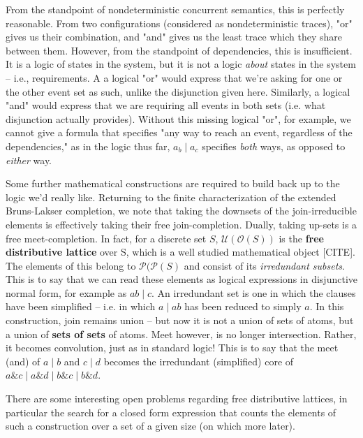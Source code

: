\documentclass[hoptionsi,review,format=acmsmall]{acmart}
\theoremstyle{definition}
\newcommand{\Oc}{\mathcal{O}}
\newcommand{\Pc}{\mathcal{P}}
\newcommand{\Ucc}{\mathcal{U}}
\newcommand{\band}{\mathbin{\&}}
\newcommand{\bor}{\mathbin{|}}
\begin{document}

From the standpoint of nondeterministic concurrent semantics, this is perfectly reasonable. From two configurations (considered as nondeterministic traces), "or" gives us their combination, and "and" gives us the least trace which they share between them. However, from the standpoint of dependencies, this is insufficient. It is a logic of states in the system, but it is not a logic \textit{about} states in the system -- i.e., requirements. A a logical "or"  would express that we're asking for one or the other event set as such, unlike the disjunction given here. Similarly, a logical "and" would express that we are requiring all events in both sets (i.e. what disjunction actually provides). Without this missing logical "or", for example, we cannot give a formula that specifies "any way to reach an event, regardless of the dependencies," as in the logic thus far, \(a_b \bor a_c\) specifies \textit{both} ways, as opposed to \textit{either} way.

Some further mathematical constructions are required to build back up to the logic we'd really like. Returning to the finite characterization of the extended Bruns-Lakser completion, we note that taking the downsets of the join-irreducible elements is effectively taking their free join-completion. Dually, taking up-sets is a free meet-completion. In fact, for a discrete set \(S\), \(\Ucc(\Oc(S))\) is the \textbf{free distributive lattice} over S, which is a well studied mathematical object [CITE]. The elements of this belong to \(\Pc(\Pc(S)\) and consist of its \textit{irredundant subsets}. This is to say that we can read these elements as logical expressions in disjunctive normal form, for example as \(ab \bor c\). An irredundant set is one in which the clauses have been simplified -- i.e. in which \(a \bor ab\) has been reduced to simply \(a\).  In this construction, join remains union -- but now it is not a union of sets of atoms, but a union of \textbf{sets of sets} of atoms. Meet however, is no longer intersection. Rather, it becomes convolution, just as in standard logic! This is to say that the meet (and) of \(a \bor b\) and \(c \bor d\) becomes the irredundant (simplified) core of \(a \band c \bor a \band d \bor b \band c \bor b \band d\).

There are some interesting open problems regarding free distributive lattices, in particular the search for a closed form expression that counts the elements of such a construction over a set of a given size (on which more later).
\end{document}
